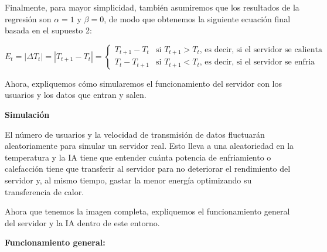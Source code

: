 \documentclass[
]{book}
\begin{document}
Finalmente, para mayor simplicidad, también asumiremos que los resultados de la regresión son \(\alpha = 1\) y \(\beta = 0\), de modo que obtenemos la siguiente ecuación final basada en el supuesto 2:

\begin{equation*}
E_t = |\Delta T_t| = |T_{t+1} - T_t| =
\begin{cases}
T_{t+1} - T_t & \textrm{si $T_{t+1} > T_t$, es decir, si el servidor se calienta} \\
T_t - T_{t+1} & \textrm{si $T_{t+1} < T_t$, es decir, si el servidor se enfria}
\end{cases}
\end{equation*}

Ahora, expliquemos cómo simularemos el funcionamiento del servidor con los usuarios y los datos que entran y salen.

\textbf{Simulación}

El número de usuarios y la velocidad de transmisión de datos fluctuarán aleatoriamente para simular un servidor real. Esto lleva a una aleatoriedad en la temperatura y la IA tiene que entender cuánta potencia de enfriamiento o calefacción tiene que transferir al servidor para no deteriorar el rendimiento del servidor y, al mismo tiempo, gastar la menor energía optimizando su transferencia de calor.

Ahora que tenemos la imagen completa, expliquemos el funcionamiento general del servidor y la IA dentro de este entorno.

\textbf{Funcionamiento general:}
\end{document}
